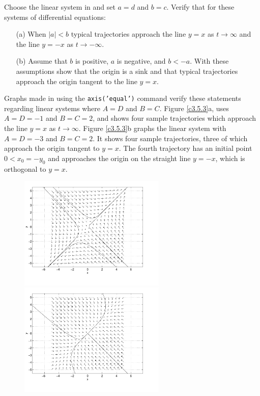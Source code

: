 \documentclass{ximera}
\begin{document}
\begin{computerExercise} \label{c3.5.3}
Choose the {\sf linear system} in {\pplane} and set
$a=d$ and $b=c$.  Verify that for these systems of differential
equations:
\begin{itemize}
\item[(a)]  When $|a|<b$ typical trajectories approach the line
$y=x$ as $t\to\infty$ and the line $y=-x$ as $t\to -\infty$.
\item[(b)]  Assume that $b$ is positive, $a$ is negative, and $b<-a$. 
With these assumptions show that the origin is a sink and that typical 
trajectories approach the origin tangent to the line $y=x$.
\end{itemize}

\begin{solution}

Graphs made in {\pplane} using the {\tt axis('equal')} command
verify these statements regarding linear systems where $A = D$
and $B = C$.  Figure \ref{c3.5.3}a, uses $A = D = -1$ and
$B = C = 2$, and shows four sample trajectories which approach
the line $y = x$ as $t \rightarrow \infty$.  Figure
\ref{c3.5.3}b graphs the linear system with $A = D = -3$
and $B = C = 2$.  It shows four sample trajectories, three of
which approach the origin tangent to $y = x$.  The fourth
trajectory has an initial point $0 < x_0 = -y_0$ and approaches
the origin on the straight line $y = -x$, which is orthogonal
to $y = x$.
\begin{figure}[htb]
                       \centerline{%
                       \includegraphics[width=2.75in]{exfigure/3-5-3a.pdf}
                       \includegraphics[width=2.75in]{exfigure/3-5-3b.pdf}}
\end{figure}

\end{solution}
\end{computerExercise}
\end{document}
